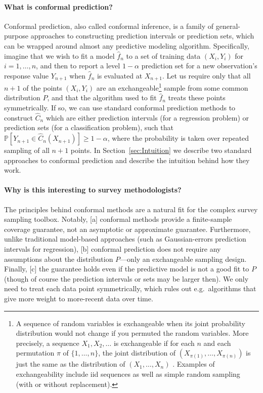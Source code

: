 \documentclass[10.5pt, letterpaper]{article}
\numberwithin{table}{section}
\numberwithin{figure}{section}
\numberwithin{equation}{section}
\begin{document}
\paragraph{What is conformal prediction?}
Conformal prediction, also called conformal inference, is a family of general-purpose approaches to constructing prediction intervals or prediction sets, which can be wrapped around almost any predictive modeling algorithm. Specifically, imagine that we wish to fit a model $\hat f_n$ to a set of training data $(X_i,Y_i)$ for $i=1,\ldots,n$, and then to report a level $1-\alpha$ prediction set for a new observation's response value $Y_{n+1}$ when $\hat f_n$ is evaluated at $X_{n+1}$. Let us require only that all $n+1$ of the points $(X_i,Y_i)$ are an
exchangeable\footnote{A sequence of random variables is exchangeable when its joint probability distribution would not change if you permuted the random variables. More precisely, a sequence $X_1,X_2,\ldots$ is exchangeable if for each $n$ and each permutation $\pi$ of $\{1,\ldots,n\}$, the joint distribution of $(X_{\pi(1)}, \ldots, X_{\pi(n)})$ is just the same as the distribution of $(X_1,\ldots,X_n)$ \citep{durrett2019probability}. Examples of exchangeability include iid sequences as well as simple random sampling (with or without replacement).}
sample from some common distribution $P$, and that the algorithm used to fit $\hat f_n$ treats these points symmetrically.
If so, we can use standard conformal prediction methods to construct $\hat C_n$ which are either prediction intervals (for a regression problem) or prediction sets (for a classification problem), such that $\mathbb{P}[Y_{n+1} \in \hat C_n(X_{n+1})] \geq 1-\alpha$,
where the probability is taken over repeated sampling of all $n+1$ points. In Section~\ref{sec:Intuition} we describe two standard approaches to conformal prediction and describe the intuition behind how they work.

\paragraph{Why is this interesting to survey methodologists?}
The principles behind conformal methods are a natural fit for the complex survey sampling toolbox. Notably, [a] conformal methods provide a finite-sample coverage guarantee, not an asymptotic or approximate guarantee.
Furthermore, unlike traditional model-based approaches (such as Gaussian-errors prediction intervals for regression), [b] conformal prediction does not require any assumptions about the distribution $P$---only an exchangeable sampling design.
Finally, [c] the guarantee holds even if the predictive model is not a good fit to $P$ (though of course the prediction intervals or sets may be larger then). We only need to treat each data point symmetrically, which rules out e.g.\ algorithms that give more weight to more-recent data over time.
\end{document}

